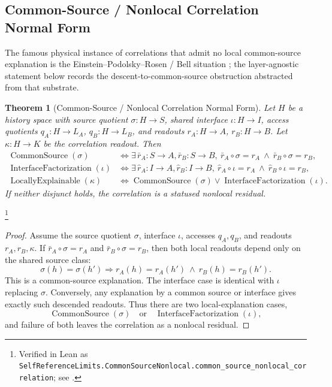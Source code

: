 \documentclass[11pt]{article}
\newtheorem{theorem}{Theorem}[section]
\theoremstyle{definition}
\begin{document}
\subsection{Common-Source / Nonlocal Correlation Normal Form}\label{sec:self-reference-limits:common-source}

The famous physical instance of correlations that admit no local
common-source explanation is the Einstein--Podolsky--Rosen / Bell
situation \citep{Bell1964EPR}; the layer-agnostic statement below
records the descent-to-common-source obstruction abstracted from
that substrate.

\begin{theorem}[Common-Source / Nonlocal Correlation Normal Form]\label{thm:F49}
Let \(H\) be a history space with source quotient \(\sigma:H\to S\),
shared interface \(\iota:H\to I\), access quotients
\(q_A:H\to L_A\), \(q_B:H\to L_B\), and readouts
\(r_A:H\to A\), \(r_B:H\to B\). Let
\(\kappa:H\to K\) be the correlation readout. Then
\begin{align*}
  \operatorname{CommonSource}(\sigma)
  &\iff
  \exists\,\bar r_A:S\to A,\bar r_B:S\to B,\
    \bar r_A\circ\sigma=r_A\ \wedge\ \bar r_B\circ\sigma=r_B,\\
  \operatorname{InterfaceFactorization}(\iota)
  &\iff
  \exists\,\hat r_A:I\to A,\hat r_B:I\to B,\
    \hat r_A\circ\iota=r_A\ \wedge\ \hat r_B\circ\iota=r_B,\\
  \operatorname{LocallyExplainable}(\kappa)
  &\iff \operatorname{CommonSource}(\sigma)
    \vee \operatorname{InterfaceFactorization}(\iota).
\end{align*}
If neither disjunct holds, the correlation is a statused nonlocal
residual.
\end{theorem}
\footnote{\raggedright Verified in Lean as
\texttt{SelfReferenceLimits.\allowbreak{}CommonSourceNonlocal.\allowbreak{}common\_source\_nonlocal\_correlation};
see \Cref{app:formalization}.}
\begin{proof}
Assume the source quotient \(\sigma\), interface \(\iota\), accesses
\(q_A,q_B\), and readouts \(r_A,r_B,\kappa\). If
\(\bar r_A\circ\sigma=r_A\) and \(\bar r_B\circ\sigma=r_B\), then both
local readouts depend only on the shared source class:
\[
  \sigma(h)=\sigma(h')\Rightarrow
  r_A(h)=r_A(h')\ \wedge\ r_B(h)=r_B(h').
\]
This is a common-source explanation. The interface case is identical
with \(\iota\) replacing \(\sigma\). Conversely, any explanation by a
common source or interface gives exactly such descended readouts. Thus
there are two local-explanation cases,
\[
  \operatorname{CommonSource}(\sigma)
  \quad\text{or}\quad
  \operatorname{InterfaceFactorization}(\iota),
\]
and failure of both leaves the correlation as a nonlocal residual.
\end{proof}
\end{document}
